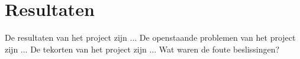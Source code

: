 \chapter{Resultaten}
De resultaten van het project zijn ...
De openstaande problemen van het project zijn ...
De tekorten van het project zijn ...
Wat waren de foute beslissingen?